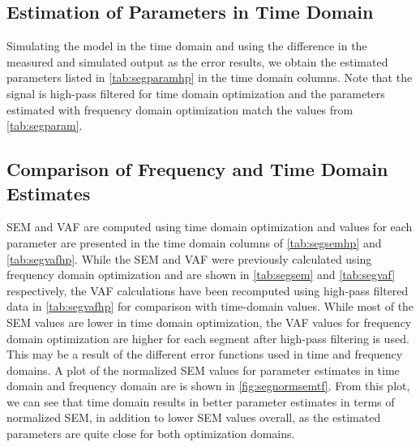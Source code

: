 \documentclass[11pt,a4paper]{article}
\begin{document}
\subsection{Estimation of Parameters in Time Domain}
Simulating the model in the time domain and using the difference in the
measured and simulated output as the error results, we obtain the estimated
parameters listed in \autoref{tab:segparamhp} in the time domain columns.
Note that the signal is high-pass filtered for time domain optimization and the
parameters estimated with frequency domain optimization match the values from
\autoref{tab:segparam}.

\subsection{Comparison of Frequency and Time Domain Estimates}
SEM and VAF are computed using time domain optimization and values for each
parameter are presented in the time domain columns of \autoref{tab:segsemhp}
and \autoref{tab:segvafhp}. While the SEM and VAF were previously calculated
using frequency domain optimization and are shown in \autoref{tab:segsem} and
\autoref{tab:segvaf} respectively, the VAF calculations have been recomputed
using high-pass filtered data in \autoref{tab:segvafhp} for comparison with
time-domain values. While most of the SEM values are lower in time domain
optimization, the VAF values for frequency domain optimization are higher for
each segment after high-pass filtering is used. This may be a result of the
different error functions used in time and frequency domains. A plot of the
normalized SEM values for parameter estimates in time domain and frequency
domain are is shown in \autoref{fig:segnormsemtf}. From this plot, we can see
that time domain results in better parameter estimates in terms of normalized
SEM, in addition to lower SEM values overall, as the estimated parameters are
quite close for both optimization domains.
\end{document}
